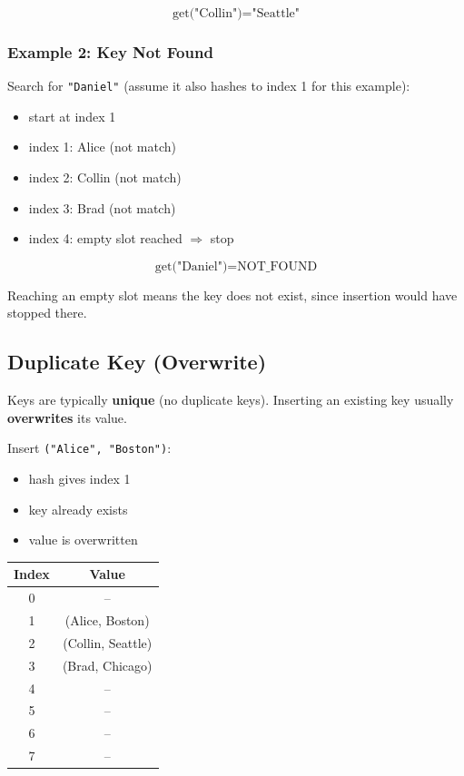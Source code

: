 \documentclass{article}
\begin{document}
\[
\text{get("Collin")} = \text{"Seattle"}
\]

\subsubsection*{Example 2: Key Not Found}
Search for \texttt{"Daniel"} (assume it also hashes to index 1 for this example):

\begin{itemize}
  \item start at index 1
  \item index 1: Alice (not match)
  \item index 2: Collin (not match)
  \item index 3: Brad (not match)
  \item index 4: empty slot reached $\Rightarrow$ stop
\end{itemize}

\[
\text{get("Daniel")} = \text{NOT\_FOUND}
\]

Reaching an empty slot means the key does not exist, since insertion would have stopped there.

\subsection{Duplicate Key (Overwrite)}
Keys are typically \textbf{unique} (no duplicate keys). Inserting an existing key usually \textbf{overwrites} its value.

Insert \texttt{("Alice", "Boston")}:

\begin{itemize}
  \item hash gives index 1
  \item key already exists
  \item value is overwritten
\end{itemize}

\begin{center}
\begin{tabular}{c c}
\toprule
Index & Value \\
\midrule
0 & -- \\
1 & (Alice, Boston) \\
2 & (Collin, Seattle) \\
3 & (Brad, Chicago) \\
4 & -- \\
5 & -- \\
6 & -- \\
7 & -- \\
\bottomrule
\end{tabular}
\end{center}
\end{document}
